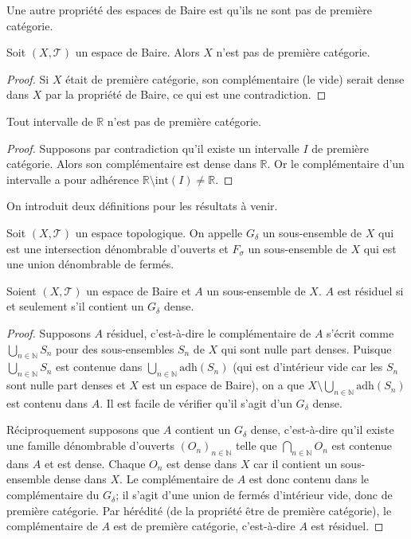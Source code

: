 Une autre propriété des espaces de Baire est qu'ils ne sont pas de première
catégorie.
\begin{prop}
  Soit $(X, \mathcal T)$ un espace de Baire. Alors $X$ n'est pas de
  première catégorie.
\end{prop}
\begin{proof}
  Si $X$ était de première catégorie, son complémentaire (le vide) serait
  dense dans $X$ par la propriété de Baire, ce qui est une contradiction.
\end{proof}

\begin{prop}
  Tout intervalle de $\mathbb R$ n'est pas de première catégorie.
\end{prop}
\begin{proof}
  Supposons par contradiction qu'il existe un intervalle $I$
  de première catégorie. Alors son complémentaire est dense dans
  $\mathbb R$. Or le complémentaire d'un intervalle a pour
  adhérence $\mathbb R\setminus \mathrm{int}(I)\neq \mathbb R$.
\end{proof}

On introduit deux définitions pour les résultats à venir.
\begin{df}
  Soit $(X, \mathcal{T})$ un espace topologique. On appelle $G_\delta$ un
  sous-ensemble de $X$ qui est une intersection dénombrable d'ouverts et
  $F_\sigma$ un sous-ensemble de $X$ qui est une union dénombrable de fermés.
\end{df}

\begin{prop}
  Soient $(X, \mathcal{T})$ un espace de Baire et $A$ un sous-ensemble
  de $X$. $A$ est résiduel si et seulement s'il contient un $G_\delta$
  dense.
\end{prop}

\begin{proof}
  Supposons $A$ résiduel, c'est-à-dire le complémentaire de $A$
  s'écrit comme $\bigcup_{n\in\mathbb N} S_n$ pour des sous-ensembles
  $S_n$ de $X$ qui sont nulle part denses. Puisque $\bigcup_{n\in\mathbb N} S_n$
  est contenue dans $\bigcup_{n\in\mathbb N} \mathrm{adh}(S_n)$ (qui est d'intérieur
  vide car les $S_n$ sont nulle part denses et $X$ est un espace de Baire),
  on a que $X\setminus \bigcup_{n\in\mathbb N} \mathrm{adh}(S_n)$ est contenu
  dans $A$. Il est facile de vérifier qu'il s'agit d'un $G_\delta$ dense.

  Réciproquement supposons que $A$ contient un $G_\delta$ dense, c'est-à-dire
  qu'il existe une famille dénombrable d'ouverts $(O_n)_{n\in\mathbb N}$ telle
  que $\bigcap_{n\in\mathbb N}O_n$ est contenue dans $A$ et est dense. Chaque
  $O_n$ est dense dans $X$ car il contient un sous-ensemble dense dans $X$.
  Le complémentaire de $A$ est donc contenu dans le complémentaire du
  $G_\delta$; il s'agit d'une union de fermés d'intérieur vide, donc
  de première catégorie. Par hérédité
  (de la propriété \og être de première catégorie\fg), le complémentaire
  de $A$ est de première catégorie, c'est-à-dire $A$ est résiduel.
\end{proof}

